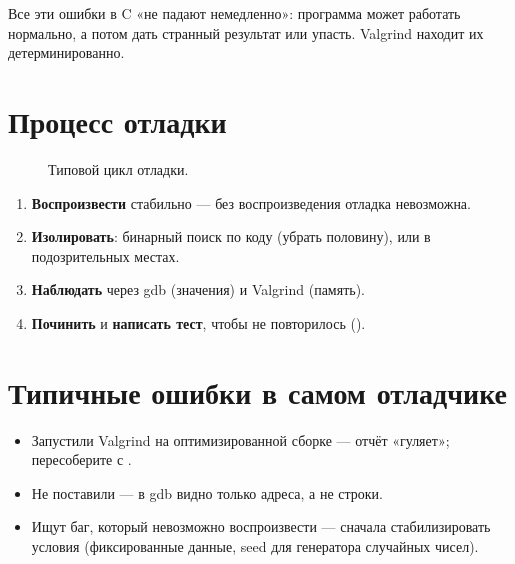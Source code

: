Все эти ошибки в C «не падают немедленно»: программа
может работать нормально, а потом дать странный
результат или упасть. Valgrind находит их
детерминированно.

\section{Процесс отладки}

\begin{figure}[htb]
  \centering
  \caption{Типовой цикл отладки.}
  \label{fig:debug-cycle}
\end{figure}

\begin{enumerate}
  \item \textbf{Воспроизвести} стабильно --- без
    воспроизведения отладка невозможна.
  \item \textbf{Изолировать}: бинарный поиск по коду
    (убрать половину),  или  в
    подозрительных местах.
  \item \textbf{Наблюдать} через gdb (значения) и
    Valgrind (память).
  \item \textbf{Починить} и \textbf{написать тест},
    чтобы не повторилось ().
\end{enumerate}

\section{Типичные ошибки в самом отладчике}
\begin{itemize}
  \item Запустили Valgrind на оптимизированной сборке ---
    отчёт «гуляет»; пересоберите с .
  \item Не поставили  --- в gdb видно только
    адреса, а не строки.
  \item Ищут баг, который невозможно воспроизвести ---
    сначала стабилизировать условия (фиксированные
    данные, seed для генератора случайных чисел).
\end{itemize}

